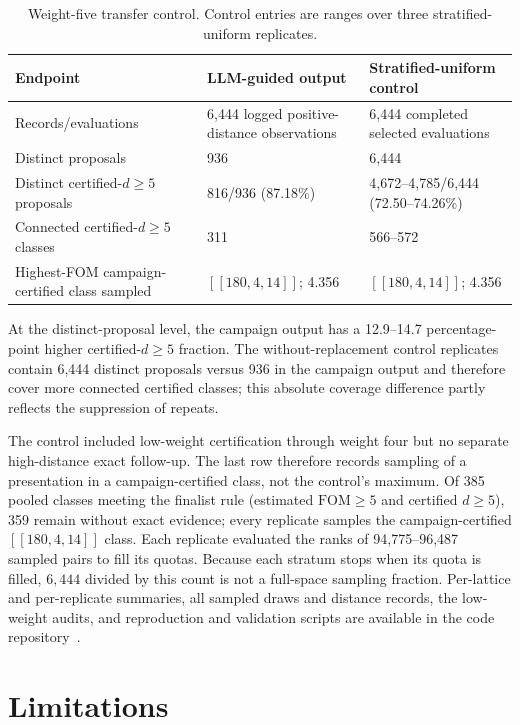 \documentclass[aps,prx,twocolumn,superscriptaddress,nofootinbib,floatfix]{revtex4-2}
\newcommand{\code}[1]{\ensuremath{\left[\!\left[#1\right]\!\right]}}
\newcommand{\FOM}{\ensuremath{\mathrm{FOM}}}
\begin{document}
\begin{table}[tbp]
\centering
\caption{Weight-five transfer control.  Control entries are ranges over three
stratified-uniform replicates.}
\label{tab:uniform-results}
\small
\begin{tabular}{@{}p{}p{}p{}@{}}
\toprule
Endpoint & LLM-guided output & Stratified-uniform control\\
\midrule
Records/evaluations & 6,444 logged positive-distance observations &
  6,444 completed selected evaluations\\
Distinct proposals & 936 & 6,444\\
Distinct certified-$d\geq5$ proposals & 816/936 (87.18\%) &
  4,672--4,785/6,444 (72.50--74.26\%)\\
Connected certified-$d\geq5$ classes & 311 & 566--572\\
Highest-FOM campaign-certified class sampled & $\code{180,4,14}$; 4.356 &
  $\code{180,4,14}$; 4.356\\
\bottomrule
\end{tabular}
\end{table}

At the distinct-proposal level, the campaign output has a 12.9--14.7
percentage-point higher certified-$d\geq5$ fraction.  The
without-replacement control replicates contain 6,444 distinct proposals versus
936 in the campaign output and therefore cover more connected certified
classes; this absolute coverage difference partly reflects the suppression of
repeats.

The control included low-weight certification through weight four but no
separate high-distance exact follow-up.  The last row therefore records
sampling of a presentation in a campaign-certified class, not the control's
maximum.  Of 385 pooled classes meeting the finalist rule (estimated
$\FOM\geq5$ and certified $d\geq5$), 359 remain without exact evidence; every
replicate samples the campaign-certified
$\code{180,4,14}$ class.  Each replicate evaluated the ranks of
94,775--96,487 sampled pairs to fill its quotas.  Because each stratum stops
when its quota is filled, $6{,}444$ divided by this count is not a full-space
sampling fraction.
Per-lattice and per-replicate summaries, all sampled draws and distance
records, the low-weight audits, and reproduction and validation scripts are
available in the code repository~\cite{cruzbenito2026qcode}.

\section{Limitations}
\label{sec:limitations}
\end{document}
